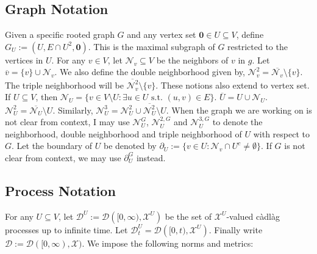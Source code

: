 \documentclass[12pt]{article}
\newcommand{\mc}{\mathcal}
\newcommand{\ov}{\overline}
\newcommand{\te}{\text}
\newcommand{\defeq}{:=}								%
\newcommand{\cad}{\mc{D}}							%
\newcommand{\sta}{\mc{X}}							%
\newcommand{\neigh}[1]{\mc{N}_{#1}}					%
\newcommand{\dneigh}[1]{\mc{N}^2_{#1}}				%
\newcommand{\tneigh}[1]{\mc{N}^3_{#1}}				%
\newcommand{\gneigh}[2]{\mc{N}^{#1}_{#2}}			%
\newcommand{\dgneigh}[2]{\mc{N}^{2,#1}_{#2}}		%
\newcommand{\tgneigh}[2]{\mc{N}^{3,#1}_{#2}}		%
\newcommand{\bdry}[1]{\partial_{#1}}				%
\newcommand{\gbdry}[2]{\partial^{#1}_{#2}}			%
\newcommand{\cl}[1]{\ov{#1}}						%
\renewcommand{\root}{\mathbf{0}}					%
\newcommand{\subg}[1]{_{#1}}						%
\newcommand{\vpara}[1]{^{#1}}						%
\newcommand{\tpara}[1]{_{#1}}						%
\begin{document}
\subsection{Graph Notation}
\label{not::g}

Given a specific rooted graph \(G\) and any vertex set \(\root \in U \subseteq V\), define \(G\subg{U} \defeq (U,E\cap U^2,\root)\). This is the maximal subgraph of \(G\) restricted to the vertices in \(U\). For any \(v \in V\), let \(\neigh{v}\subseteq V\) be the neighbors of \(v\) in \(g\). Let \(\cl{v} = \{v\}\cup\neigh{v}\). We also define the double neighborhood given by, \(\dneigh{v} = \cl{\neigh{v}}\setminus \{v\}\). The triple neighborhood will be \(\cl{\dneigh{v}} \setminus \{v\}\). These notions also extend to vertex set. If \(U\subseteq V\), then \(\neigh{U} = \{v \in V\setminus U: \exists u \in U\te{ s.t. } (u,v) \in E\}\). \(\cl{U} = U\cup \neigh{U}\). \(\dneigh{U} = \cl{\neigh{U}}\setminus U\). Similarly, \(\tneigh{U} = \dneigh{U} \cup \cl{\dneigh{U}}\setminus U\). When the graph we are working on is not clear from context, I may use \(\gneigh{G}{U}\), \(\dgneigh{G}{U}\) and \(\tgneigh{G}{U}\) to denote the neighborhood, double neighborhood and triple neighborhood of \(U\) with respect to \(G\). Let the boundary of \(U\) be denoted by \(\bdry{U} \defeq \{v \in U: \neigh{v}\cap U^c \neq \emptyset\}\). If \(G\) is not clear from context, we may use \(\gbdry{G}{U}\) instead.

\subsection{Process Notation}
\label{not::p}

For any \(U \subseteq V\), let \(\cad\vpara{U} := \cad\left([0,\infty),\sta^U\right)\) be the set of \(\sta^U\)-valued c\`adl\`ag processes up to infinite time. Let \(\cad\vpara{U}\tpara{t} = \cad\left([0,t),\sta^U\right)\). Finally write \(\cad \defeq \cad([0,\infty),\sta)\). We impose the following norms and metrics:
\end{document}
